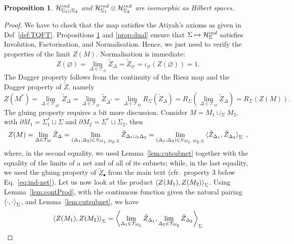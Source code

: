 \documentclass[10pt,a4paper]{amsart}
\newtheorem{proposition}{Proposition}
\newcommand{\Hind}{\mathcal{H}_{\Sigma}^{\rm ind}}
\newcommand{\del}{\partial}
\newcommand{\h}{\mathcal{H}}
\begin{document}
\begin{proposition}
\label{prop:factor}
    $\h_{\Sigma_1\sqcup\Sigma_2}^{\rm ind}$ and $\h_{\Sigma_1}^{\rm ind}\otimes\h_{\Sigma_2}^{\rm ind}$ are isomorphic as Hilbert spaces.
\end{proposition}

    \begin{proof}
        We have to check that the map satisfies the Atiyah's axioms as given in Def~\ref{def:TQFT}. Propositions \ref{prop:factor} and \ref{prop:dual} ensure that $\Sigma\mapsto\Hind$ satisfies Involution, Factorisation, and Normalisation. Hence, we just need to verify the properties of the limit $Z(M)$.
        Normalisation is immediate:
        \[Z(\varnothing)=\lim_{\Delta\in\mathcal{T}_{\varnothing}}\tilde{Z}_{\Delta}=\tilde{Z}_{\varnothing}=\iota_{\varnothing}(Z(\varnothing))=1.\]
        The Dagger property follows from the continuity of the Riesz map and the Dagger property of $\tilde{Z}$, namely
        \[Z(M^*)=\lim_{\Delta\in\mathcal{T}_{M^*}}\tilde{Z}_{\Delta}=\lim_{\Delta\in\mathcal{T}_{M}}\tilde{Z}_{\Delta^*}=\lim_{\Delta\in\mathcal{T}_{M}}R_{\Sigma}(\tilde{Z}_{\Delta})=R_{\Sigma}(\lim_{\Delta\in\mathcal{T}_{M}}\tilde{Z}_{\Delta})=R_{\Sigma}(Z(M)).\]
        The gluing property requires a bit more discussion. Consider $M=M_1\cup_{\Sigma}M_2$, with $\del M_1=\Sigma_1^*\sqcup\Sigma$ and $\del M_2=\Sigma^*\sqcup\Sigma_2$, then
        \begin{align*}
    Z(M)=\lim_{\Delta\in\mathcal{T}_M}\tilde{Z}_{\Delta}=\lim_{(\Delta_1,\Delta_2)\in S_{M_1,M_2,\Sigma}}\tilde{Z}_{\Delta_1\cup_{\delta}\Delta_2}=\lim_{(\Delta_1,\Delta_2)\in S_{M_1,M_2,\Sigma}}\braket{\tilde{Z}_{\Delta_1},\tilde{Z}_{\Delta_2}}_{\Sigma}\;,
\end{align*}
where, in the second equality, we used Lemma~\ref{lem:cutsubnet} together with the equality of the limits of a net and of all of its subnets; while, in the last equality, we used the gluing property of $\tilde Z_{\bullet}$ from the main text (cfr.~property 3 below Eq.~\eqref{eq:ind-net}).
    Let us now look at the product $\braket{Z(M_1),Z(M_2)}_{\Sigma}$. Using Lemma~\ref{lem:contProd}, with the continuous function given the natural pairing $\braket{\cdot,\cdot}_{\Sigma}$, and Lemma~\ref{lem:cutsubnet}, we have
    \begin{align*}
\braket{Z(M_1),Z(M_2)}_{\Sigma}&=\left\langle\lim_{\Delta_1\in\mathcal{T}_{M_1}}\tilde{Z}_{\Delta_1},\lim_{\Delta_2\in\mathcal{T}_{M_2}}\tilde{Z}_{\Delta_2}\right\rangle_{\Sigma}\\

\end{align*}
\end{proof}
\end{document}
